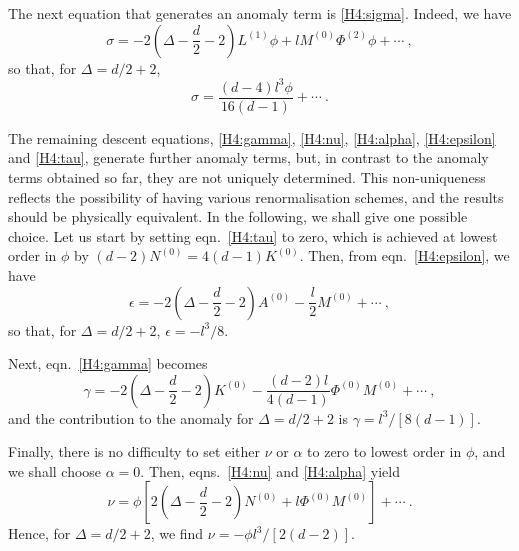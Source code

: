 \documentclass[a4paper,12pt]{article}
\begin{document}
The next equation that generates an anomaly term is
\eqref{H4:sigma}. Indeed, we have 
\begin{equation}
\label{perturb:sigma}
  \sigma = -2 \left( \Delta-\frac{d}2-2\right) L^{(1)}\phi 
  + l M^{(0)} \Phi^{(2)} \phi +\cdots~, 
\end{equation}
so that, for $\Delta=d/2+2$, 
\[ \sigma = \frac{(d-4) l^3 \phi}{16(d-1)} + \cdots~.\]

The remaining descent equations, \eqref{H4:gamma}, \eqref{H4:nu},
\eqref{H4:alpha}, \eqref{H4:epsilon} and \eqref{H4:tau}, generate
further anomaly terms, but, in contrast to the anomaly terms obtained
so far, they are not uniquely determined. This non-uniqueness reflects
the possibility of having various renormalisation schemes, and the
results should be physically equivalent. In the following, we shall
give one possible choice. Let us start by setting eqn.\ \eqref{H4:tau}
to zero, which is achieved at lowest order in $\phi$ by $(d-2) N^{(0)}
= 4(d-1) K^{(0)}$. Then, from eqn.\ \eqref{H4:epsilon}, we have 
\begin{equation}
\label{perturb:epsilon}
  \epsilon = -2 \left( \Delta- \frac{d}2 -2\right) A^{(0)} -\frac{l}2
  M^{(0)}+\cdots~, 
\end{equation}
so that, for $\Delta=d/2+2$, $\epsilon=-l^3/8$. 

Next, eqn.\ \eqref{H4:gamma} becomes
\begin{equation}
\label{perturb:gamma}
  \gamma = -2 \left( \Delta- \frac{d}2 -2\right) K^{(0)} -
  \frac{(d-2)l}{4(d-1)} \Phi^{(0)} M^{(0)} +\cdots~, 
\end{equation}
and the contribution to the anomaly for $\Delta=d/2+2$ is
$\gamma=l^3/[8(d-1)]$. 

Finally, there is no difficulty to set either $\nu$ or $\alpha$ to
zero to lowest order in $\phi$, and we shall choose $\alpha=0$. Then,
eqns.\ \eqref{H4:nu} and \eqref{H4:alpha} yield
\begin{equation}
\label{perturb:nu}
  \nu = \phi \left[ 2\left(\Delta-\frac{d}2-2\right) N^{(0)} +l
  \Phi^{(0)} M^{(0)} \right] +\cdots~.
\end{equation}
Hence, for $\Delta=d/2+2$, we find $\nu = -\phi l^3/[2(d-2)]$.
\end{document}
